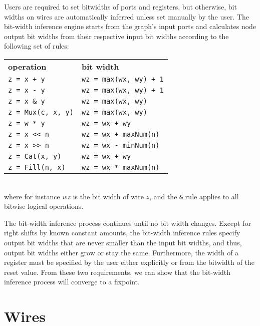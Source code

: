 \documentclass[10pt,twocolumn]{article}
\begin{document}

Users are required to set bitwidths of ports and registers, but otherwise,
bit widths on wires are automatically inferred unless set manually by the user.
The bit-width inference engine starts from the graph's input ports and 
calculates node output bit widths from their respective input bit widths according to the following set of rules:\\

{\footnotesize
\begin{tabular}{ll}
{\bf operation} & {\bf bit width} \\ 
\verb|z = x + y| & \verb|wz = max(wx, wy) + 1| \\
\verb+z = x - y+ & \verb|wz = max(wx, wy) + 1|\\
\verb+z = x & y+ & \verb+wz = max(wx, wy)+ \\
\verb+z = Mux(c, x, y)+ & \verb+wz = max(wx, wy)+ \\
\verb+z = w * y+ & \verb!wz = wx + wy! \\
\verb+z = x << n+ & \verb!wz = wx + maxNum(n)! \\
\verb+z = x >> n+ & \verb+wz = wx - minNum(n)+ \\
\verb+z = Cat(x, y)+ & \verb!wz = wx + wy! \\
\verb+z = Fill(n, x)+ & \verb+wz = wx * maxNum(n)+ \\
\end{tabular}
}
\\[1mm]
\noindent  
where for instance $wz$ is the bit width of wire $z$, and the \verb+&+
rule applies to all bitwise logical operations.

The bit-width inference process continues until no bit width changes.
Except for right shifts by known constant amounts, the bit-width
inference rules specify output bit widths that are never smaller than
the input bit widths, and thus, output bit widths either grow or stay
the same.  Furthermore, the width of a register must be specified by
the user either explicitly or from the bitwidth of the reset value.
From these two requirements, we can show that the bit-width inference
process will converge to a fixpoint.

\section{Wires}
\end{document}
